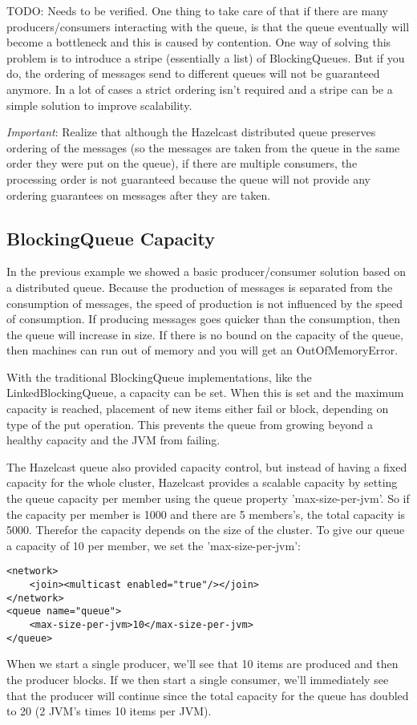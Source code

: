TODO: Needs to be verified.
One thing to take care of that if there are many producers/consumers interacting with the queue, is that the queue eventually will become a bottleneck and this is caused by contention. One way of solving this problem is to introduce a stripe (essentially a list) of BlockingQueues. But if you do, the ordering of messages send to different queues will not be guaranteed anymore. In a lot of cases a strict ordering isn't required and a stripe can be a simple solution to improve scalability.

\emph{Important}: Realize that although the Hazelcast distributed queue preserves ordering of the messages (so the messages are taken from the queue in the same order they were put on the queue), if there are multiple consumers, the processing order is not guaranteed because the queue will not provide any ordering guarantees on messages after they are taken.

\subsection{BlockingQueue Capacity}
In the previous example we showed a basic producer/consumer solution based on a distributed queue. Because the production of messages is separated from the consumption of messages, the speed of production is not influenced by the speed of consumption. If producing messages goes quicker than the consumption, then the queue will increase in size. If there is no bound on the capacity of the queue, then machines can run out of memory and you will get an OutOfMemoryError. 

With the traditional BlockingQueue implementations, like the LinkedBlockingQueue, a capacity can be set. When this is set and the maximum capacity is reached, placement of new items either fail or block, depending on type of the put operation. This prevents the queue from growing beyond a healthy capacity and the JVM from failing.

The Hazelcast queue also provided capacity control, but instead of having a fixed capacity for the whole cluster, Hazelcast provides a scalable capacity by setting the queue capacity per member using the queue property 'max-size-per-jvm'. So if the capacity per member is 1000 and there are 5 members's, the total capacity is 5000. Therefor the capacity depends on the size of the cluster. To give our queue a capacity of 10 per member, we set the 'max-size-per-jvm':
\begin{lstlisting}
<network>
    <join><multicast enabled="true"/></join>
</network>
<queue name="queue">
    <max-size-per-jvm>10</max-size-per-jvm>
</queue>
\end{lstlisting}
When we start a single producer, we'll see that 10 items are produced and then the producer blocks. If we then start a single consumer, we'll immediately see that the producer will continue since the total capacity for the queue has doubled to 20 (2 JVM's times 10 items per JVM). 

